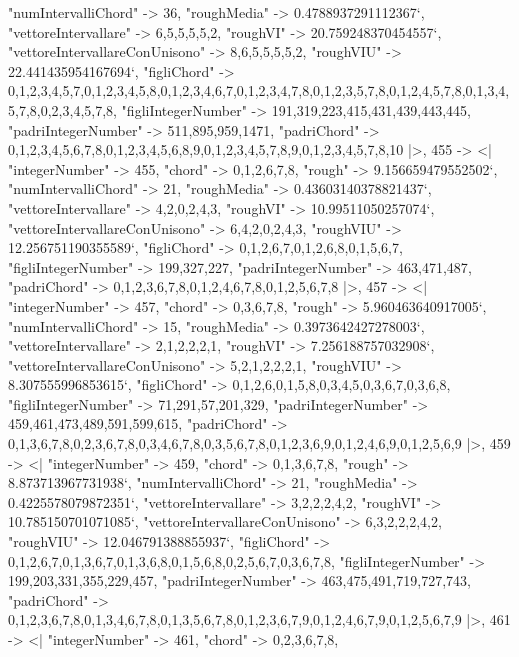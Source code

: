\documentclass[
]{article}
\begin{document}
\begin{DatasetVerbatim}
    "numIntervalliChord" -> 36,
    "roughMedia" -> 0.4788937291112367`,
    "vettoreIntervallare" -> {6,5,5,5,5,2},
    "roughVI" -> 20.759248370454557`,
    "vettoreIntervallareConUnisono" -> {8,6,5,5,5,5,2},
    "roughVIU" -> 22.441435954167694`,
    "figliChord" -> {{0,1,2,3,4,5,7},{0,1,2,3,4,5,8},{0,1,2,3,4,6,7},{0,1,2,3,4,7,8},{0,1,2,3,5,7,8},{0,1,2,4,5,7,8},{0,1,3,4,5,7,8},{0,2,3,4,5,7,8}},
    "figliIntegerNumber" -> {191,319,223,415,431,439,443,445},
    "padriIntegerNumber" -> {511,895,959,1471},
    "padriChord" -> {{0,1,2,3,4,5,6,7,8},{0,1,2,3,4,5,6,8,9},{0,1,2,3,4,5,7,8,9},{0,1,2,3,4,5,7,8,10}}
  |>,
  455 -> <|
    "integerNumber" -> 455,
    "chord" -> {0,1,2,6,7,8},
    "rough" -> 9.156659479552502`,
    "numIntervalliChord" -> 21,
    "roughMedia" -> 0.43603140378821437`,
    "vettoreIntervallare" -> {4,2,0,2,4,3},
    "roughVI" -> 10.99511050257074`,
    "vettoreIntervallareConUnisono" -> {6,4,2,0,2,4,3},
    "roughVIU" -> 12.256751190355589`,
    "figliChord" -> {{0,1,2,6,7},{0,1,2,6,8},{0,1,5,6,7}},
    "figliIntegerNumber" -> {199,327,227},
    "padriIntegerNumber" -> {463,471,487},
    "padriChord" -> {{0,1,2,3,6,7,8},{0,1,2,4,6,7,8},{0,1,2,5,6,7,8}}
  |>,
  457 -> <|
    "integerNumber" -> 457,
    "chord" -> {0,3,6,7,8},
    "rough" -> 5.960463640917005`,
    "numIntervalliChord" -> 15,
    "roughMedia" -> 0.3973642427278003`,
    "vettoreIntervallare" -> {2,1,2,2,2,1},
    "roughVI" -> 7.256188757032908`,
    "vettoreIntervallareConUnisono" -> {5,2,1,2,2,2,1},
    "roughVIU" -> 8.307555996853615`,
    "figliChord" -> {{0,1,2,6},{0,1,5,8},{0,3,4,5},{0,3,6,7},{0,3,6,8}},
    "figliIntegerNumber" -> {71,291,57,201,329},
    "padriIntegerNumber" -> {459,461,473,489,591,599,615},
    "padriChord" -> {{0,1,3,6,7,8},{0,2,3,6,7,8},{0,3,4,6,7,8},{0,3,5,6,7,8},{0,1,2,3,6,9},{0,1,2,4,6,9},{0,1,2,5,6,9}}
  |>,
  459 -> <|
    "integerNumber" -> 459,
    "chord" -> {0,1,3,6,7,8},
    "rough" -> 8.873713967731938`,
    "numIntervalliChord" -> 21,
    "roughMedia" -> 0.4225578079872351`,
    "vettoreIntervallare" -> {3,2,2,2,4,2},
    "roughVI" -> 10.785150701071085`,
    "vettoreIntervallareConUnisono" -> {6,3,2,2,2,4,2},
    "roughVIU" -> 12.046791388855937`,
    "figliChord" -> {{0,1,2,6,7},{0,1,3,6,7},{0,1,3,6,8},{0,1,5,6,8},{0,2,5,6,7},{0,3,6,7,8}},
    "figliIntegerNumber" -> {199,203,331,355,229,457},
    "padriIntegerNumber" -> {463,475,491,719,727,743},
    "padriChord" -> {{0,1,2,3,6,7,8},{0,1,3,4,6,7,8},{0,1,3,5,6,7,8},{0,1,2,3,6,7,9},{0,1,2,4,6,7,9},{0,1,2,5,6,7,9}}
  |>,
  461 -> <|
    "integerNumber" -> 461,
    "chord" -> {0,2,3,6,7,8},

\end{DatasetVerbatim}
\end{document}

